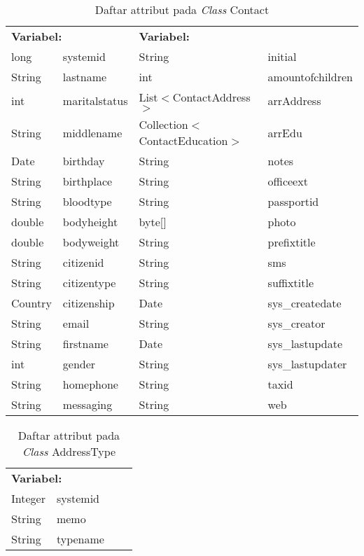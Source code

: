 \begin{table}[H]
	\caption{Daftar attribut pada \textit{Class} Contact}
	\centering
	\small
	\begin{adjustbox}{width=1\textwidth}	
		\begin{tabular}{|p{2cm} p{2.1cm} p{5cm} p{3.1cm}|}
			\hline
			\multicolumn{2}{|l}{\textbf{Variabel:}}&\multicolumn{2}{l|}{\textbf{Variabel:}}\\
			long&systemid&String&initial\\
			String&lastname&int&amountofchildren\\
			int&maritalstatus&List$<$ContactAddress$>$&arrAddress\\
			String&middlename&Collection$<$ContactEducation$>$&arrEdu\\
			Date&birthday&String&notes\\
			String&birthplace&String&officeext\\
			String&bloodtype&String&passportid\\
			double&bodyheight&byte[]&photo\\
			double&bodyweight&String&prefixtitle\\
			String&citizenid&String&sms\\
			String&citizentype&String&suffixtitle\\
			Country&citizenship&Date&sys\_createdate\\
			String&email&String&sys\_creator\\
			String&firstname&Date&sys\_lastupdate\\
			int&gender&String&sys\_lastupdater\\
			String&homephone&String&taxid\\
			String&messaging&String&web\\
			\hline
		\end{tabular}
	\end{adjustbox}
\end{table}
\begin{table}[H]
	\caption{Daftar attribut pada \textit{Class} AddressType}
	\centering
	\small
	\begin{adjustbox}{width=1\textwidth}	
		\begin{tabular}{|p{4cm} p{2.1cm} p{3cm} p{3.1cm}|}
			\hline
			\multicolumn{2}{|l}{\textbf{Variabel:}}&\multicolumn{2}{l|}{\textbf{}}\\
			Integer&systemid&&\\
			String&memo&&\\
			String&typename&&\\
			\hline
		\end{tabular}
	\end{adjustbox}
\end{table}
